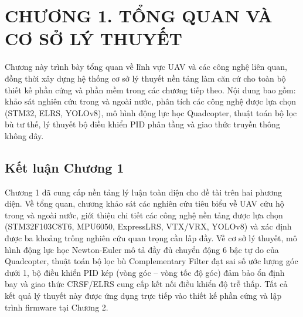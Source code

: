 \section*{CHƯƠNG 1. TỔNG QUAN VÀ CƠ SỞ LÝ THUYẾT}
\setcounter{section}{1}
\setcounter{subsection}{0}
\setcounter{figure}{0}
\setcounter{table}{0}

Chương này trình bày tổng quan về lĩnh vực UAV và các công nghệ liên quan, đồng thời xây dựng hệ thống cơ sở lý thuyết nền tảng làm căn cứ cho toàn bộ thiết kế phần cứng và phần mềm trong các chương tiếp theo. Nội dung bao gồm: khảo sát nghiên cứu trong và ngoài nước, phân tích các công nghệ được lựa chọn (STM32, ELRS, YOLOv8), mô hình động lực học Quadcopter, thuật toán bộ lọc bù tư thế, lý thuyết bộ điều khiển PID phân tầng và giao thức truyền thông không dây.



\bigskip


\subsection*{Kết luận Chương 1}

Chương 1 đã cung cấp nền tảng lý luận toàn diện cho đề tài trên hai phương diện. Về tổng quan, chương khảo sát các nghiên cứu tiêu biểu về UAV cứu hộ trong và ngoài nước, giới thiệu chi tiết các công nghệ nền tảng được lựa chọn (STM32F103C8T6, MPU6050, ExpressLRS, VTX/VRX, YOLOv8) và xác định được ba khoảng trống nghiên cứu quan trọng cần lấp đầy. Về cơ sở lý thuyết, mô hình động lực học Newton-Euler mô tả đầy đủ chuyển động 6 bậc tự do của Quadcopter, thuật toán bộ lọc bù Complementary Filter đạt sai số ước lượng góc dưới 1\degree{}, bộ điều khiển PID kép (vòng góc -- vòng tốc độ góc) đảm bảo ổn định bay và giao thức CRSF/ELRS cung cấp kết nối điều khiển độ trễ thấp. Tất cả kết quả lý thuyết này được ứng dụng trực tiếp vào thiết kế phần cứng và lập trình firmware tại Chương 2.

